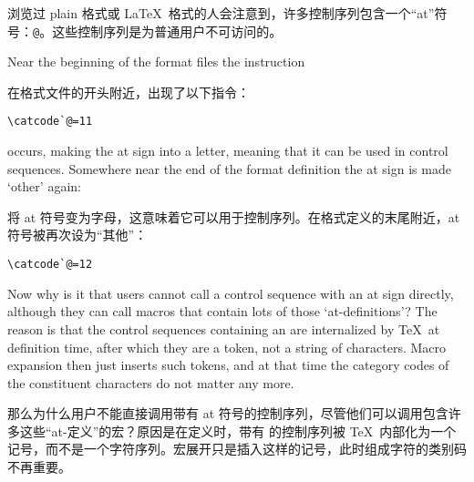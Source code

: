 浏览过 plain 格式或 \LaTeX\ 格式的人会注意到，许多控制序列包含一个“at”符号：\verb-@-。这些控制序列是为普通用户不可访问的。

Near the beginning of the format files the instruction

在格式文件的开头附近，出现了以下指令：
\begin{verbatim}
\catcode`@=11
\end{verbatim}
occurs, making the at sign into a letter,
meaning that it can be used in control sequences. Somewhere near the
end of the format definition the at sign is made `other' again:

将 at 符号变为字母，这意味着它可以用于控制序列。在格式定义的末尾附近，at 符号被再次设为“其他”：
\begin{verbatim}
\catcode`@=12
\end{verbatim}

Now why is it that users cannot
call a control sequence with an at sign
directly, although they can call macros that contain lots of those
`at-definitions'? The reason is that the control sequences
containing an \n@ are internalized by \TeX\ at definition time,
after which they are a token, not a string of characters. 
Macro expansion then
just inserts such tokens, and at that time the category codes
of the constituent characters do not matter any more.

那么为什么用户不能直接调用带有 at 符号的控制序列，尽管他们可以调用包含许多这些“at-定义”的宏？原因是在定义时，带有 \n@ 的控制序列被 \TeX\ 内部化为一个记号，而不是一个字符序列。宏展开只是插入这样的记号，此时组成字符的类别码不再重要。
